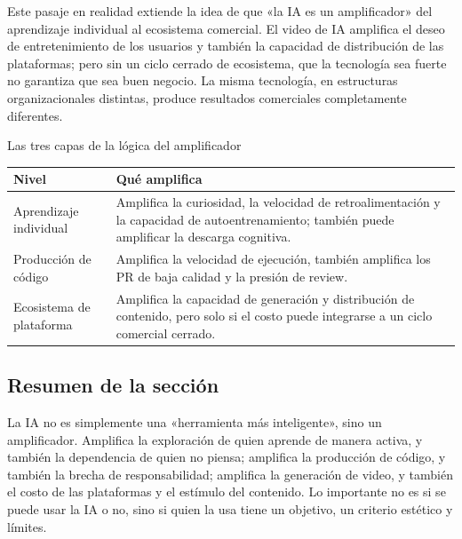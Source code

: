 Este pasaje en realidad extiende la idea de que «la IA es un amplificador» del aprendizaje individual al ecosistema comercial. El video de IA amplifica el deseo de entretenimiento de los usuarios y también la capacidad de distribución de las plataformas; pero sin un ciclo cerrado de ecosistema, que la tecnología sea fuerte no garantiza que sea buen negocio. La misma tecnología, en estructuras organizacionales distintas, produce resultados comerciales completamente diferentes.

\begin{knowledgebox}{Las tres capas de la lógica del amplificador}
\begin{tabularx}{\textwidth}{>{\raggedright\arraybackslash}p{} Y}
\toprule
Nivel & Qué amplifica \\
\midrule
Aprendizaje individual & Amplifica la curiosidad, la velocidad de retroalimentación y la capacidad de autoentrenamiento; también puede amplificar la descarga cognitiva. \\
Producción de código & Amplifica la velocidad de ejecución, también amplifica los PR de baja calidad y la presión de review. \\
Ecosistema de plataforma & Amplifica la capacidad de generación y distribución de contenido, pero solo si el costo puede integrarse a un ciclo comercial cerrado. \\
\bottomrule
\end{tabularx}
\end{knowledgebox}

\subsection{Resumen de la sección}

La IA no es simplemente una «herramienta más inteligente», sino un amplificador. Amplifica la exploración de quien aprende de manera activa, y también la dependencia de quien no piensa; amplifica la producción de código, y también la brecha de responsabilidad; amplifica la generación de video, y también el costo de las plataformas y el estímulo del contenido. Lo importante no es si se puede usar la IA o no, sino si quien la usa tiene un objetivo, un criterio estético y límites.

